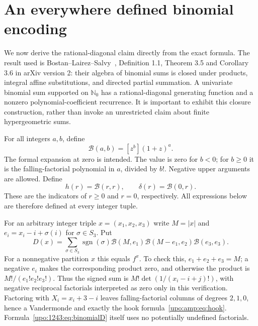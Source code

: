 \documentclass[11pt,letterpaper]{article}
\theoremstyle{remark}\newtheorem{remark}[theorem]{Remark}
\numberwithin{equation}{section}
\newcommand{\N}{\mathbb N_0}
\newcommand{\sgn}{\operatorname{sgn}}
\begin{document}
\section{An everywhere defined binomial encoding}\label{upo:1243:sec:BLS}
We now derive the rational-diagonal claim directly from the exact
formula. The result used is Bostan--Lairez--Salvy~\cite{BLS},
Definition 1.1, Theorem 3.5 and Corollary 3.6 in arXiv version 2:
their algebra of binomial sums is closed under products, integral affine
substitutions, and directed partial summation. A univariate binomial sum
supported on $\N$ has a rational-diagonal generating function and a
nonzero polynomial-coefficient recurrence. It is important to exhibit
this closure construction, rather than invoke an unrestricted claim
about finite hypergeometric sums.

For all integers $a,b$, define
\[
 \mathcal B(a,b)=[z^b](1+z)^a.
\]
The formal expansion at zero is intended. The value is zero for $b<0$;
for $b\ge0$ it is the falling-factorial polynomial in $a$, divided by
$b!$. Negative upper arguments are allowed. Define
\[
 h(r)=\mathcal B(r,r),\qquad \delta(r)=\mathcal B(0,r).
\]
These are the indicators of $r\ge0$ and $r=0$, respectively. All
expressions below are therefore defined at every integer tuple.

For an arbitrary integer triple $x=(x_1,x_2,x_3)$ write $M=|x|$ and
$e_i=x_i-i+\sigma(i)$ for $\sigma\in S_3$. Put
\begin{equation}\label{upo:1243:eq:binomialD}
 D(x)=\sum_{\sigma\in S_3}\sgn(\sigma)
 \mathcal B(M,e_1)\mathcal B(M-e_1,e_2)\mathcal B(e_3,e_3).
\end{equation}
For a nonnegative partition $x$ this equals $f^x$. To check this,
$e_1+e_2+e_3=M$; a negative $e_i$ makes the corresponding product zero,
and otherwise the product is $M!/(e_1!e_2!e_3!)$. Thus the signed sum is
$M!\det(1/(x_i-i+j)!)$, with negative reciprocal factorials interpreted
as zero only in this verification. Factoring with $X_i=x_i+3-i$ leaves
falling-factorial columns of degrees $2,1,0$, hence a Vandermonde and
exactly the hook formula~\eqref{upo:amp:eq:hook}. Formula~\eqref{upo:1243:eq:binomialD}
itself uses no potentially undefined factorials.
\end{document}
